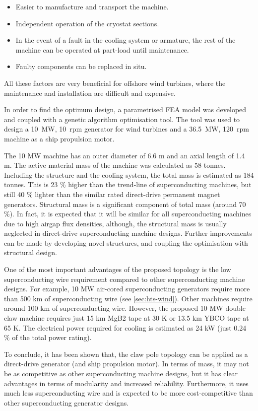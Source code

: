 \documentclass[12pt]{iopart}
\begin{document}
\begin{itemize}
  \item Easier to manufacture and transport the machine.
  \item Independent operation of the cryostat sections.
  \item In the event of a fault in the cooling system or armature, the rest of the machine can be operated at part-load until maintenance.
  \item Faulty components can be replaced in situ.
\end{itemize}

All these factors are very beneficial for offshore wind turbines, where the maintenance and installation are difficult and expensive.

In order to find the optimum design, a parametrised FEA model was developed and coupled with a genetic algorithm optimisation tool. The tool was used to design a 10~MW, 10~rpm generator for wind turbines and a 36.5~MW, 120~rpm machine as a ship propulsion motor.

The 10 MW machine has an outer diameter of 6.6 m and an axial length of 1.4 m. The active material mass of the machine was calculated as 58 tonnes. Including the structure and the cooling system, the total mass is estimated as 184 tonnes. This is 23 \% higher than the trend-line of superconducting machines, but still 40 \% lighter than the similar rated direct-drive permanent magnet generators.
Structural mass is a significant component of total mass (around 70 \%). In fact, it is expected that it will be similar for all superconducting machines due to high airgap flux densities, although, the structural mass is usually neglected in direct-drive superconducting machine designs. Further improvements can be made by developing novel structures, and coupling the optimisation with structural design.

One of the most important advantages of the proposed topology is the low superconducting wire requirement compared to other superconducting machine designs. For example, 10 MW air-cored superconducting generators require more than 500 km of superconducting wire (see \ref{sec:hts-wind}). Other machines require around 100 km of superconducting wire. However, the proposed 10 MW double-claw machine requires just 15 km MgB2 tape at 30 K or 13.5 km YBCO tape at 65 K. The electrical power required for cooling is estimated as 24 kW (just 0.24 \% of the total power rating). 


To conclude, it has been shown that, the claw pole topology can be applied as a direct-drive generator (and ship propulsion motor). In terms of mass, it may not be as competitive as other superconducting machine designs, but it has clear advantages in terms of modularity and increased reliability. Furthermore, it uses much less superconducting wire and is expected to be more cost-competitive than other superconducting generator designs.
\end{document}
